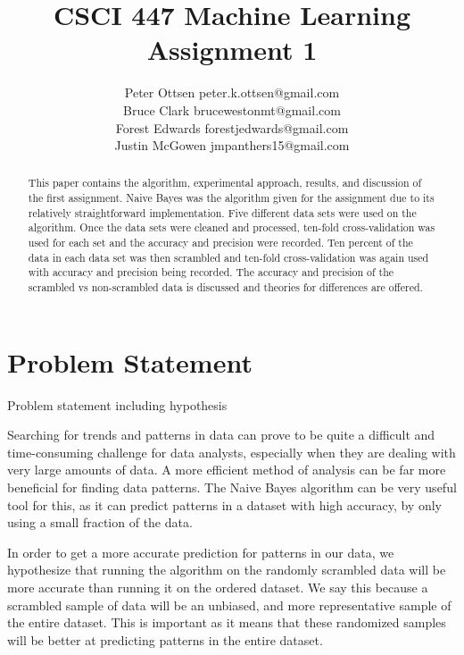 \documentclass[twoside,11pt]{article}
\begin{document}
\title{CSCI 447 Machine Learning Assignment 1}

\author{\name Peter Ottsen \email peter.k.ottsen@gmail.com\\
\name Bruce Clark \email brucewestonmt@gmail.com\\
\name Forest Edwards \email forestjedwards@gmail.com\\
\name Justin McGowen \email jmpanthers15@gmail.com}


\maketitle

\begin{abstract}%

This paper contains the algorithm, experimental approach, results, and discussion of the first assignment.  Naive Bayes was the algorithm given for the assignment due to its relatively straightforward implementation. Five different data sets were used on the algorithm. Once the data sets were cleaned and processed, ten-fold cross-validation was used for each set and the accuracy and precision were recorded. Ten percent of the data in each data set was then scrambled and ten-fold cross-validation was again used with accuracy and precision being recorded.  The accuracy and precision of the scrambled vs non-scrambled data is discussed and theories for differences are offered.

\end{abstract}

\section{Problem Statement}

Problem statement including hypothesis

Searching for trends and patterns in data can prove to be quite a difficult and time-consuming challenge for data analysts, especially when they are dealing with very large amounts of data.  A more efficient method of analysis can be far more beneficial for finding data patterns.  The Naive Bayes algorithm can be very useful tool for this, as it can predict patterns in a dataset with high accuracy, by only using a small fraction of the data.  

In order to get a more accurate prediction for patterns in our data, we hypothesize that running the algorithm on the randomly scrambled data will be more accurate than running it on the ordered dataset.  We say this because a scrambled sample of data will be an unbiased, and more representative sample of the entire dataset.  This is important as it means that these randomized samples will be better at predicting patterns in the entire dataset.
\end{document}
